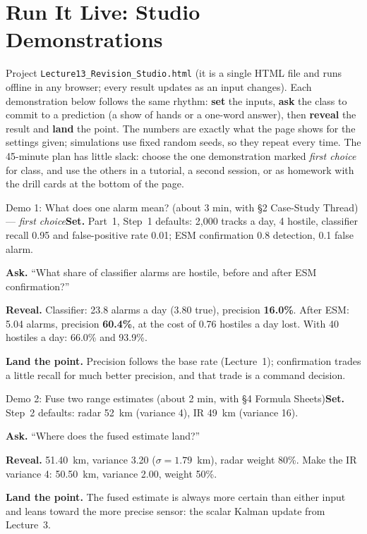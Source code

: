 \documentclass[11pt]{article}
\begin{document}
\section{Run It Live: Studio Demonstrations}\label{sec:live}

Project \texttt{Lecture13\_Revision\_Studio.html} (it is a single HTML file and runs offline in any browser; every result updates as an input changes). Each demonstration below follows the same rhythm: \textbf{set} the inputs, \textbf{ask} the class to commit to a prediction (a show of hands or a one-word answer), then \textbf{reveal} the result and \textbf{land} the point. The numbers are exactly what the page shows for the settings given; simulations use fixed random seeds, so they repeat every time. The 45-minute plan has little slack: choose the one demonstration marked \emph{first choice} for class, and use the others in a tutorial, a second session, or as homework with the drill cards at the bottom of the page.

\begin{live}{Demo 1: What does one alarm mean? (about 3 min, with \S2 Case-Study Thread) --- \emph{first choice}}\textbf{Set.} Part~1, Step~1 defaults: 2,000 tracks a day, 4 hostile, classifier recall 0.95 and false-positive rate 0.01; ESM confirmation 0.8 detection, 0.1 false alarm.\par\smallskip\textbf{Ask.} ``What share of classifier alarms are hostile, before and after ESM confirmation?''\par\smallskip\textbf{Reveal.} Classifier: 23.8 alarms a day (3.80 true), precision \textbf{16.0\%}. After ESM: 5.04 alarms, precision \textbf{60.4\%}, at the cost of 0.76 hostiles a day lost. With 40 hostiles a day: 66.0\% and 93.9\%.\par\smallskip\textbf{Land the point.} Precision follows the base rate (Lecture~1); confirmation trades a little recall for much better precision, and that trade is a command decision.\end{live}

\begin{live}{Demo 2: Fuse two range estimates (about 2 min, with \S4 Formula Sheets)}\textbf{Set.} Step~2 defaults: radar 52~km (variance 4), IR 49~km (variance 16).\par\smallskip\textbf{Ask.} ``Where does the fused estimate land?''\par\smallskip\textbf{Reveal.} 51.40~km, variance 3.20 ($\sigma=1.79$~km), radar weight 80\%. Make the IR variance 4: 50.50~km, variance 2.00, weight 50\%.\par\smallskip\textbf{Land the point.} The fused estimate is always more certain than either input and leans toward the more precise sensor: the scalar Kalman update from Lecture~3.\end{live}
\end{document}
